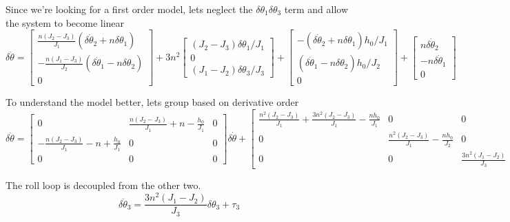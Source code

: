 \documentclass[]{article}
\begin{document}
Since we're looking for a first order model, lets neglect the $\delta \theta_1 \delta \theta_3$ term and allow the system to become linear
\begin{equation}
	\delta \ddot{\theta} = \begin{bmatrix}
		\frac{n(J_2 - J_3)}{J_1} \left(\delta \dot{\theta}_2 + n \delta \theta_1\right) \\
		-\frac{n(J_1 - J_3)}{J_2} \left(\delta \dot{\theta}_1 - n \delta \theta_2\right) \\
		0
	\end{bmatrix} +  3 n^2 \begin{bmatrix}
		(J_2 - J_3) \delta \theta_1/J_1 \\
		0\\
		(J_1 - J_2) \delta \theta_3/J_3
	\end{bmatrix} + \begin{bmatrix}
	-\left(\delta \dot{\theta}_2 + n \delta \theta_1\right) h_0/J_1 \\
	\left(\delta \dot{\theta}_1 - n \delta \theta_2\right) h_0/J_2 \\
	0
	\end{bmatrix} + \begin{bmatrix}
		n \delta \dot{\theta}_2 \\
		-n \delta \dot{\theta}_1 \\
		0 
	\end{bmatrix}
\end{equation}

To understand the model better, lets group based on derivative order
\begin{equation}
	\delta \ddot{\theta} = \begin{bmatrix}
		0 & \frac{n(J_2 - J_3)}{J_1} + n - \frac{h_0}{J_1} & 0 \\
		- \frac{n(J_2 - J_3)}{J_1} - n + \frac{h_0}{J_1} & 0 & 0 \\
		0 & 0 & 0
	\end{bmatrix}
	\delta \dot{\theta} + \begin{bmatrix}
		\frac{n^2(J_2 - J_3)}{J_1} + \frac{3n^2(J_2 - J_3)}{J_1} - \frac{n h_0}{J_1} & 0 & 0 \\
		0 & \frac{n^2(J_2 - J_3)}{J_1} - \frac{n h_0}{J_2} & 0 \\
		0 & 0 & \frac{3n^2(J_1 - J_2)}{J_3}
	\end{bmatrix}
	\delta \theta
\end{equation}

The roll loop is decoupled from the other two.
\begin{equation}
	\delta \ddot{\theta}_3 = \frac{3n^2(J_1 - J_2)}{J_3} \delta \theta_3 + \tau_3
\end{equation}
\end{document}

